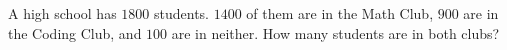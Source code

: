 A high school has $1800$ students. $1400$ of them are in the Math Club, $900$ are in the Coding Club, and $100$ are in neither. How many students are in both clubs?

